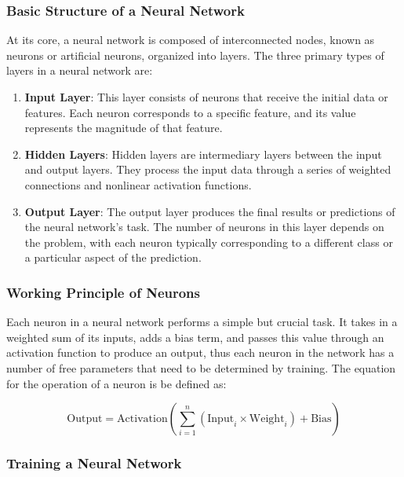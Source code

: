\subsubsection{Basic Structure of a Neural Network}

At its core, a neural network is composed of interconnected nodes, known as neurons or artificial neurons, organized into layers. The three primary types of layers in a neural network are:

\begin{enumerate}
	\item \textbf{Input Layer}: This layer consists of neurons that receive the initial data or features. Each neuron corresponds to a specific feature, and its value represents the magnitude of that feature.
	
	\item \textbf{Hidden Layers}: Hidden layers are intermediary layers between the input and output layers. They process the input data through a series of weighted connections and nonlinear activation functions.
	
	\item \textbf{Output Layer}: The output layer produces the final results or predictions of the neural network's task. The number of neurons in this layer depends on the problem, with each neuron typically corresponding to a different class or a particular aspect of the prediction.
\end{enumerate}

\subsubsection{Working Principle of Neurons}

Each neuron in a neural network performs a simple but crucial task. It takes in a weighted sum of its inputs, adds a bias term, and passes this value through an activation function to produce an output, thus each neuron in the network has a number of free parameters that need to be determined by training. The equation for the operation of a neuron is be defined as:

\begin{equation}
	\text{Output} = \text{Activation}\left(\sum_{i=1}^{n} (\text{Input}_i \times \text{Weight}_i) + \text{Bias}\right)
\end{equation}

\subsubsection{Training a Neural Network}

